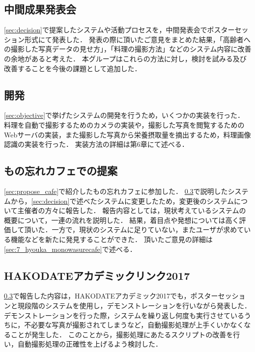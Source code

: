 \documentclass[../report]{subfiles}
\begin{document}
\subsection{中間成果発表会}
\ref{sec:decision}で提案したシステムや活動プロセスを，中間発表会でポスターセッション形式にて発表した．
発表の際に頂いたご意見をまとめた結果，「高齢者への撮影した写真データの見せ方」，「料理の撮影方法」などのシステム内容に改善の余地があると考えた．
本グループはこれらの方法に対し，検討を試みる及び改善することを今後の課題として追加した．

\subsection{開発}
\ref{sec:objective}で挙げたシステムの開発を行うため，いくつかの実装を行った．
料理を自動で撮影するためのカメラの実装や，撮影した写真を閲覧するためのWebサーバの実装，また撮影した写真から栄養摂取量を摘出するため，料理画像認識の実装を行った．
実装方法の詳細は第6章にて述べる．

\subsection{もの忘れカフェでの提案} \label{sec:propose_cafe2}
\ref{sec:propose_cafe}で紹介したもの忘れカフェに参加した．
\ref{sec:propose_cafe2}で説明したシステムから，\ref{sec:decision}で述べたシステムに変更したため，変更後のシステムについて主催者の方々に報告した．
報告内容としては，現状考えているシステムの概要について，一連の流れを説明した．
結果，着目点や発想については高く評価して頂いた．一方で，現状のシステムに足りていない，またユーザが求めている機能などを新たに発見することができた．
頂いたご意見の詳細は\ref{sec:7_hyouka_monowasurecafe}で述べる．

\subsection{HAKODATEアカデミックリンク2017}
\ref{sec:propose_cafe2}で報告した内容は，HAKODATEアカデミック2017でも，ポスターセッションと現段階のシステムを使用し，デモンストレーションを行いながら発表した．
デモンストレーションを行った際，システムを繰り返し何度も実行させているうちに，不必要な写真が撮影されてしまうなど，自動撮影処理が上手くいかなくなることが発生した．
このことから，撮影処理にあたるスクリプトの改善を行い，自動撮影処理の正確性を上げるよう検討した．
\end{document}
